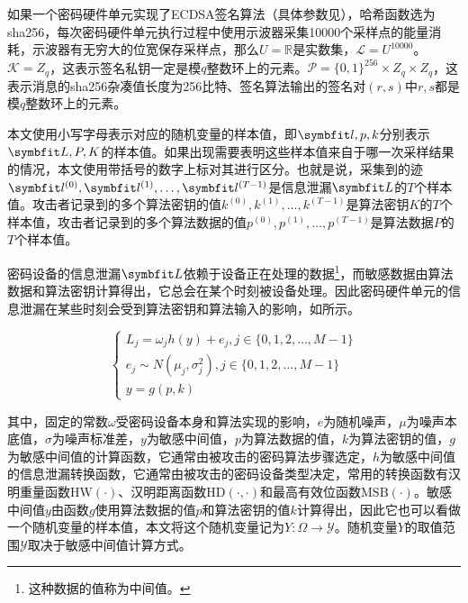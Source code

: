 {	\begin{example}
		如果一个密码硬件单元实现了ECDSA签名算法（具体参数见），哈希函数选为sha256\citep{FIPS180-4}，每次密码硬件单元执行过程中使用示波器采集10000个采样点的能量消耗，示波器有无穷大的位宽保存采样点，那么$U=\mathbb R$是实数集，$\mathcal L=U^{10000}$。$\mathcal K=Z_q$，这表示签名私钥一定是模$q$整数环上的元素。$\mathcal P=\{0,1\}^{256}\times Z_q\times Z_q$，这表示消息的sha256杂凑值长度为256比特、签名算法输出的签名对$(r,s)$中$r,s$都是模$q$整数环上的元素。
	\end{example}
	
	
	本文使用小写字母表示对应的随机变量的样本值，即$\Vector l,p,k$分别表示$\Vector L,P,K$的样本值。如果出现需要表明这些样本值来自于哪一次采样结果的情况，本文使用带括号的数字上标对其进行区分。也就是说，采集到的迹$\Vector {l^{(0)}}, \Vector {l^{(1)}}, \dots, \Vector {l^{(T-1)}}$是信息泄漏$\Vector L$的$T$个样本值。攻击者记录到的多个算法密钥的值$k^{(0)}, k^{(1)}, \dots, k^{(T-1)}$是算法密钥$K$的$T$个样本值，攻击者记录到的多个算法数据的值$p^{(0)}, p^{(1)}, \dots, p^{(T-1)}$是算法数据$P$的$T$个样本值。
	
	密码设备的信息泄漏$\Vector L$依赖于设备正在处理的数据\footnote{这种数据的值称为中间值。}，而敏感数据由算法数据和算法密钥计算得出，它总会在某个时刻被设备处理。因此密码硬件单元的信息泄漏在某些时刻会受到算法密钥和算法输入的影响，如所示。
	
	\begin{equation}
		\begin{cases}
			L_j=\omega_j h(y)+e_j,j\in\{0,1,2,\dots,M-1\}\\
			e_j\sim N(\mu_j,\sigma_j^2),j\in\{0,1,2,\dots,M-1\}\\
			y=g(p,k)
		\end{cases}\label{eq:leakagedetail}
	\end{equation}
	
	\noindent 其中，固定的常数$\omega$受密码设备本身和算法实现的影响，$e$为随机噪声，$\mu$为噪声本底值，$\sigma$为噪声标准差，$y$为敏感中间值，$p$为算法数据的值，$k$为算法密钥的值，$g$为敏感中间值的计算函数，它通常由被攻击的密码算法步骤选定，$h$为敏感中间值的信息泄漏转换函数，它通常由被攻击的密码设备类型决定，常用的转换函数有汉明重量函数$\mathrm {HW}(\cdot)$、汉明距离函数$\mathrm {HD}(\cdot,\cdot)$和最高有效位函数$\mathrm {MSB}(\cdot)$。敏感中间值$y$由函数$g$使用算法数据的值$p$和算法密钥的值$k$计算得出，因此它也可以看做一个随机变量的样本值，本文将这个随机变量记为$Y:\mathcal \Omega\rightarrow \mathcal Y$。随机变量$Y$的取值范围$\mathcal Y$取决于敏感中间值计算方式。
	
}
